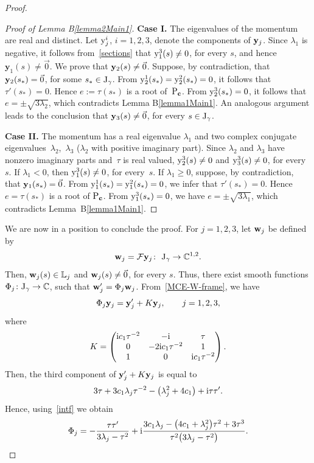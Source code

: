 \documentclass[pdftex]{sigma}
\numberwithin{equation}{section}
\def\C{\mathbb{C}}
\begin{document}
\begin{proof}
\begin{proof}[Proof of Lemma B\ref{lemma2Main1}]
{\bf Case I.} The eigenvalues of the momentum are real and distinct. Let ${\rm y}_j^i$, $i=1,2,3$, denote
the components of ${\bf y}_j$. Since $\lambda_1$ is negative, it follows from~\eqref{sections} that ${\rm y}^3_1(s)\neq 0$,
for every $s$, and hence $\mathbf{y}_1(s)\neq \vec{0}$. We prove that {${\bf y}_2(s)\neq \vec{0}$.
Suppose, by contradiction, that ${\bf y}_2(s_*)=\vec{0}$}, for some $s_*\in {\rm J}_{\gamma}$.
From ${\rm y}^1_2(s_*)={\rm y}^2_2(s_*)=0$, it follows that {$\tau'(s_*)=0$}.
Hence $e:=\tau(s_*)$ is a root of~${\rm P}_{{\bf c}}$. From ${\rm y}^3_2(s_*)=0$,
it follows that $e=\pm \sqrt{3\lambda_2}$, which contradicts Lemma B\ref{lemma1Main1}. An analogous argument leads to
the conclusion that ${\bf y}_3(s)\neq \vec{0}$, for every $s\in {\rm J}_{\gamma}$.

{\bf Case II.} The momentum has a real eigenvalue $\lambda_1$ and two complex conjugate eigenvalues~$\lambda_2$,~$\lambda_3$
($\lambda_2$ with positive imaginary part).
Since $\lambda_2$ and $\lambda_3$ have nonzero imaginary parts and~$\tau$ is real valued,
${\rm y}_2^3(s)\neq 0$ and ${\rm y}_3^3(s)\neq 0$, for every $s$. If $\lambda_1<0$, then ${\rm y}_1^3(s)\neq 0$,
for every~$s$.
If $\lambda_1\ge 0$, suppose, by contradiction, that ${\bf y}_1(s_*)=\vec{0}$.
From ${\rm y}_1^1(s_*)={\rm y}^2_1(s_*)=0$,
we infer that $\tau'(s_*)=0$. Hence $e=\tau(s_*)$ is a root of ${\rm P}_{{\bf c}}$.
From ${\rm y}^3_1(s_*)=0$, we have $e=\pm \sqrt{3\lambda_1}$, which contradicts Lemma~B\ref{lemma1Main1}.
\end{proof}

We are now in a position to conclude the proof. For $j=1,2,3$, let ${\bf w}_j$ be defined by
\[
 {\bf w}_j={\mathcal F}{\bf y}_j\colon \ {\rm J}_{\gamma}\to \C^{1,2}.
\]
Then, ${\bf w}_j(s)\in {\mathbb L}_j$ and ${\bf w}_j(s)\neq \vec{0}$, for every $s$.
Thus, there exist smooth functions $\Phi_j\colon{\rm J}_{\gamma}\to \C$, such that
${\bf w}'_j=\Phi_j {\bf w}_j$. From~\eqref{MCE-W-frame}, we have
\begin{equation}\label{intf}
 \Phi_j {\bf y}_j={\bf y}'_j+K{\bf y}_j,\qquad j=1,2,3,
 \end{equation}
where
\[
K= \begin{pmatrix}
{\rm i}c_1\tau^{-2} & -{\rm i} & \tau\\
0 &-2{\rm i}c_1\tau^{-2} & 1 \\
1 & 0&{\rm i}c_1\tau^{-2}\\
 \end{pmatrix}.
\]
Then, the third component of ${\bf y}'_j+K{\bf y}_j$ is equal to
\[
 3\tau+3c_1\lambda_j\tau^{-2}-\big(\lambda_j^2+4c_1\big)+{\rm i}\tau{\tau}'.
\]
Hence, using~\eqref{intf} we obtain
\begin{equation}\label{intf2}
 \Phi_j=-\frac{\tau \tau'}{3\lambda_j-\tau^2}
 +{\rm i}\frac{3c_1\lambda_j-\big(4c_1+\lambda_j^2\big)\tau^2+3\tau^3}{\tau^2\big(3\lambda_j-\tau^2\big)}.
 \end{equation}


\end{proof}
\end{document}
